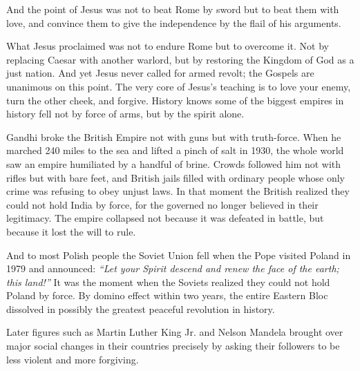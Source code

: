 And the point of Jesus was not to beat Rome by sword but to beat them with love,
and convince them to give the independence by the flail of his arguments.

What Jesus proclaimed was not to endure Rome but to overcome it.
Not by replacing Caesar with another warlord, but by restoring the Kingdom of God as a just nation.
And yet Jesus never called for armed revolt; the Gospels are unanimous on this point.
The very core of Jesus’s teaching is to love your enemy, turn the other cheek, and forgive.
History knows some of the biggest empires in history fell not by force of arms, but by the spirit alone.

Gandhi broke the British Empire not with guns but with truth-force.
When he marched 240 miles to the sea and lifted a pinch of salt in 1930, the whole world saw an empire humiliated by a handful of brine.
Crowds followed him not with rifles but with bare feet, and British jails filled with ordinary people whose only crime was refusing to obey unjust laws.
In that moment the British realized they could not hold India by force, for the governed no longer believed in their legitimacy.
The empire collapsed not because it was defeated in battle, but because it lost the will to rule.

And to most Polish people the Soviet Union fell when the Pope visited Poland in 1979 and announced:
\emph{“Let your Spirit descend and renew the face of the earth; this land!”}
It was the moment when the Soviets realized they could not hold Poland by force.
By domino effect within two years, the entire Eastern Bloc dissolved in possibly the greatest peaceful revolution in history.

Later figures such as Martin Luther King Jr. and Nelson Mandela brought over major social changes in their countries precisely by asking their followers to be less violent and more forgiving.


